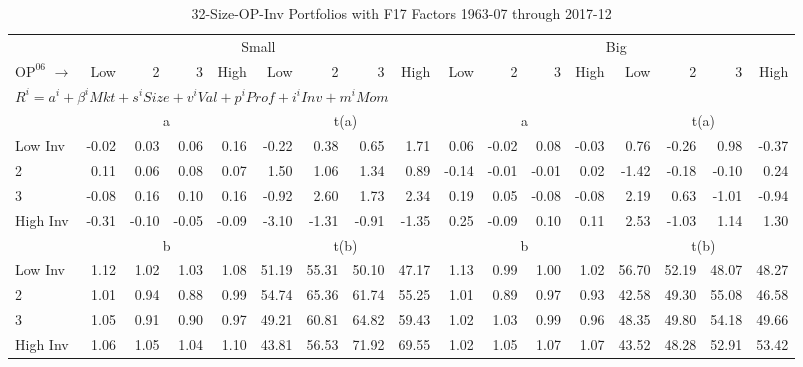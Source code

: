 
\begin{table}[!ht]
\footnotesize
\centering
\caption{32-Size-OP-Inv Portfolios with F17 Factors 1963-07 through 2017-12}
\begin{tabular}{lrrrrrrrrrrrrrrrr}
  \toprule
     & \multicolumn{8}{c}{Small} & \multicolumn{8}{c}{Big}  \\
     \cmidrule(r){2-9} \cmidrule(r){10-17}
    $\text{OP}^{06}$ $\rightarrow$ & Low & 2 & 3 & High & Low & 2 & 3 & High & Low & 2 & 3 & High & Low & 2 & 3 & High  \\ 
  \midrule
  \multicolumn{17}{l}{$R^i=a^i+\beta^iMkt+s^iSize+v^iVal+p^iProf+i^iInv+m^iMom$}  \\
  
     & \multicolumn{4}{c}{a} & \multicolumn{4}{c}{t(a)}  & \multicolumn{4}{c}{a} & \multicolumn{4}{c}{t(a)}   \\
     \cmidrule(r){2-5} \cmidrule(r){6-9}  \cmidrule(r){10-13} \cmidrule(r){14-17} 
    Low Inv  & -0.02  & 0.03  & 0.06  & 0.16  & -0.22  & 0.38  & 0.65  & 1.71  & 0.06  & -0.02  & 0.08  & -0.03  & 0.76  & -0.26  & 0.98  & -0.37   \\
    2  & 0.11  & 0.06  & 0.08  & 0.07  & 1.50  & 1.06  & 1.34  & 0.89  & -0.14  & -0.01  & -0.01  & 0.02  & -1.42  & -0.18  & -0.10  & 0.24   \\
    3  & -0.08  & 0.16  & 0.10  & 0.16  & -0.92  & 2.60  & 1.73  & 2.34  & 0.19  & 0.05  & -0.08  & -0.08  & 2.19  & 0.63  & -1.01  & -0.94   \\
    High Inv  & -0.31  & -0.10  & -0.05  & -0.09  & -3.10  & -1.31  & -0.91  & -1.35  & 0.25  & -0.09  & 0.10  & 0.11  & 2.53  & -1.03  & 1.14  & 1.30   \\
    
  
     & \multicolumn{4}{c}{b} & \multicolumn{4}{c}{t(b)}  & \multicolumn{4}{c}{b} & \multicolumn{4}{c}{t(b)}   \\
     \cmidrule(r){2-5} \cmidrule(r){6-9}  \cmidrule(r){10-13} \cmidrule(r){14-17} 
    Low Inv  & 1.12  & 1.02  & 1.03  & 1.08  & 51.19  & 55.31  & 50.10  & 47.17  & 1.13  & 0.99  & 1.00  & 1.02  & 56.70  & 52.19  & 48.07  & 48.27   \\
    2  & 1.01  & 0.94  & 0.88  & 0.99  & 54.74  & 65.36  & 61.74  & 55.25  & 1.01  & 0.89  & 0.97  & 0.93  & 42.58  & 49.30  & 55.08  & 46.58   \\
    3  & 1.05  & 0.91  & 0.90  & 0.97  & 49.21  & 60.81  & 64.82  & 59.43  & 1.02  & 1.03  & 0.99  & 0.96  & 48.35  & 49.80  & 54.18  & 49.66   \\
    High Inv  & 1.06  & 1.05  & 1.04  & 1.10  & 43.81  & 56.53  & 71.92  & 69.55  & 1.02  & 1.05  & 1.07  & 1.07  & 43.52  & 48.28  & 52.91  & 53.42   \\
    

\end{tabular}
\end{table}

